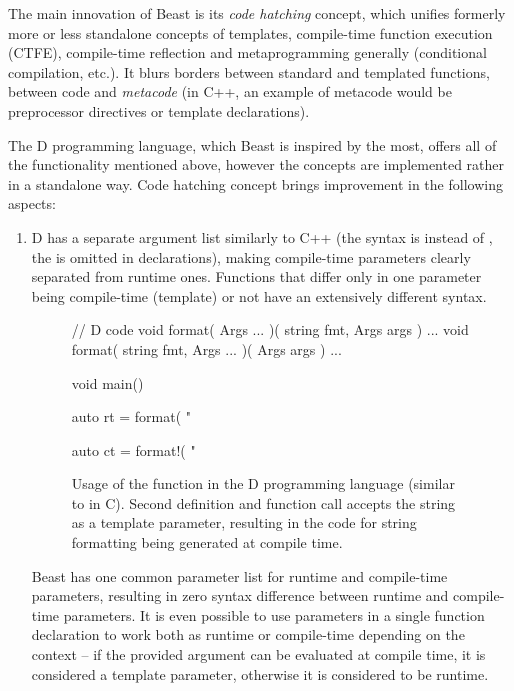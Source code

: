 \documentclass{ExcelAtFIT}
\begin{document}
The main innovation of Beast is its \textit{code hatching} concept, which unifies formerly more or less standalone concepts of templates, compile-time function execution (CTFE), compile-time reflection and metaprogramming generally (conditional compilation, etc.). It blurs borders between standard and templated functions, between code and \textit{metacode} (in C++, an example of metacode would be preprocessor directives or template declarations).

The D programming language, which Beast is inspired by the most, offers all of the functionality mentioned above, however the concepts are implemented rather in a standalone way. Code hatching concept brings improvement in the following aspects:
\begin{enumerate}
	\item D has a separate argument list similarly to C++ (the syntax is  instead of , the \inlineDCode{!} is omitted in declarations), making compile-time parameters clearly separated from runtime ones. Functions that differ only in one parameter being compile-time (template) or not have an extensively different syntax.
	
	 \begin{figure}[h]
	 	\begin{dcode}
// D code
void format( Args ... )( string fmt, Args args ) { ... }
void format( string fmt, Args ... )( Args args ) { ... }

void main() {
	auto rt = format( "%
		
	auto ct = format!( "%
}
	 	\end{dcode}
	 	\caption{Usage of the  function in the D programming language (similar to  in C). Second  definition and function call accepts the  string as a template parameter, resulting in the code for string formatting being generated at compile time.}
 		\label{fig:dFormat}
	 \end{figure}
 
 	Beast has one common parameter list for runtime and compile-time parameters, resulting in zero syntax difference between runtime and com\-pile-time parameters. It is even possible to use parameters in a single function declaration to work both as runtime or compile-time depending on the context -- if the provided argument can be evaluated at compile time, it is considered a template parameter, otherwise it is considered to be runtime.
 

\end{enumerate}
\end{document}
